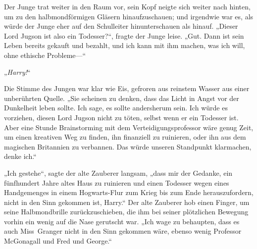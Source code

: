 Der Junge trat weiter in den Raum vor, sein Kopf neigte sich weiter nach hinten, um zu den halbmondförmigen Gläsern hinaufzuschauen; und irgendwie war es, als würde der Junge eher auf den Schulleiter hinunterschauen als hinauf. „Dieser Lord Jugson ist also ein Todesser?“, fragte der Junge leise. „Gut. Dann ist sein Leben bereits gekauft und bezahlt, und ich kann mit ihm machen, was ich will, ohne ethische Probleme—“

„\emph{Harry!}“

Die Stimme des Jungen war klar wie Eis, gefroren aus reinstem Wasser aus einer unberührten Quelle. „Sie scheinen zu denken, dass das Licht in Angst vor der Dunkelheit leben sollte. Ich sage, es sollte andersherum sein. Ich würde es vorziehen, diesen Lord Jugson nicht zu töten, selbst wenn er ein Todesser ist. Aber eine Stunde Brainstorming mit dem Verteidigungsprofessor wäre genug Zeit, um einen kreativen Weg zu finden, ihn finanziell zu ruinieren, oder ihn aus dem magischen Britannien zu verbannen. Das würde unseren Standpunkt klarmachen, denke ich.“

„Ich gestehe“, sagte der alte Zauberer langsam, „dass mir der Gedanke, ein fünfhundert Jahre altes Haus zu ruinieren und einen Todesser wegen eines Handgemenges in einem Hogwarts-Flur zum Krieg bis zum Ende herauszufordern, nicht in den Sinn gekommen ist, Harry.“ Der alte Zauberer hob einen Finger, um seine Halbmondbrille zurückzuschieben, die ihm bei seiner plötzlichen Bewegung vorhin ein wenig auf die Nase gerutscht war. „Ich wage zu behaupten, dass es auch Miss~Granger nicht in den Sinn gekommen wäre, ebenso wenig Professor McGonagall und Fred und George.“

